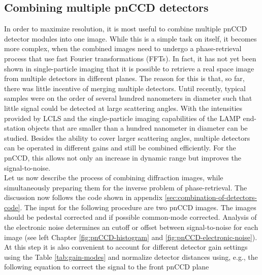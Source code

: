 \subsection{Combining multiple pnCCD detectors}\label{sec:combination-of-images}
In order to maximize resolution, it is most useful to combine multiple pnCCD detector modules into one image. While this is a simple task on itself, it becomes more complex, when the combined images need to undergo a phase-retrieval process that use fast Fourier transformations (FFTs). In fact, it has not yet been shown in single-particle imaging that it is possible to retrieve a real space image from multiple detectors in different planes.
The reason for this is that, so far, there was little incentive of merging multiple detectors. Until recently, typical samples were on the order of several hundred nanometers in diameter such that little signal could be detected at large scattering angles. With the intensities provided by LCLS and the single-particle imaging capabilities of the LAMP end-station objects that are smaller than a hundred nanometer in diameter can be studied.
Besides the ability to cover larger scattering angles, multiple detectors can be operated in different gains and still be combined efficiently. For the pnCCD, this allows not only an increase in dynamic range but improves the signal-to-noise.\\
Let us now describe the process of combining diffraction images, while simultaneously preparing them for the inverse problem of phase-retrieval. The discussion now follows the code shown in appendix \ref{sec:combination-of-detectors-code}. The input for the following procedure are two pnCCD images. The images should be pedestal corrected and if possible common-mode corrected. Analysis of the electronic noise determines an cutoff or offset between signal-to-noise for each image (see left Chapter \ref{fig:pnCCD-histogram} and \ref{fig:pnCCD-electronic-noise}). At this step it is also convenient to account for different detector gain settings using the Table \ref{tab:gain-modes} and normalize detector distances using, e.g., the following equation to correct the signal to the front pnCCD plane
